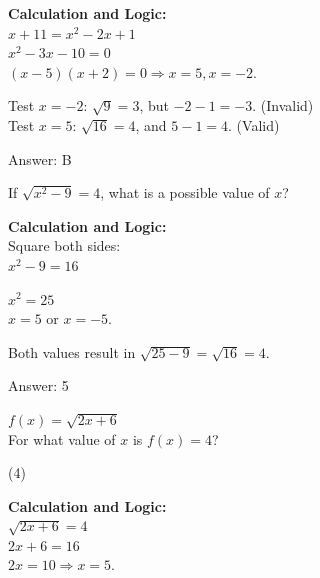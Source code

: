 \documentclass[11pt,paper=a4,answers]{exam}
\begin{document}
\begin{questions}
\begin{solution}
\vspace{20pt}

\textbf{Calculation and Logic:} \\
$x + 11 = x^2 - 2x + 1$ \\
$x^2 - 3x - 10 = 0$ \\
$(x - 5)(x + 2) = 0 \Rightarrow x = 5, x = -2$.

\vspace{10pt}

Test $x = -2$: $\sqrt{9} = 3$, but $-2 - 1 = -3$. (Invalid) \\
Test $x = 5$: $\sqrt{16} = 4$, and $5 - 1 = 4$. (Valid)

\vspace{25pt}

Answer: \colorbox{yellow!100}{B}
\end{solution}

\vspace{40pt}

\question
If $\sqrt{x^2 - 9} = 4$, what is a possible value of $x$?

\begin{solution}
\textbf{Calculation and Logic:} \\
Square both sides: \\
$x^2 - 9 = 16$

\vspace{10pt}

$x^2 = 25$ \\
$x = 5$ or $x = -5$.

\vspace{10pt}

Both values result in $\sqrt{25 - 9} = \sqrt{16} = 4$.

\vspace{25pt}

Answer: \colorbox{yellow!100}{5}
\end{solution}

\vspace{40pt}

\question
$f(x) = \sqrt{2x + 6}$ \\
For what value of $x$ is $f(x) = 4$?
\begin{tasks}(4)
\end{tasks}

\begin{solution}
\textbf{Calculation and Logic:} \\
$\sqrt{2x + 6} = 4$ \\
$2x + 6 = 16$ \\
$2x = 10 \Rightarrow x = 5$.


\end{solution}
\end{questions}
\end{document}
